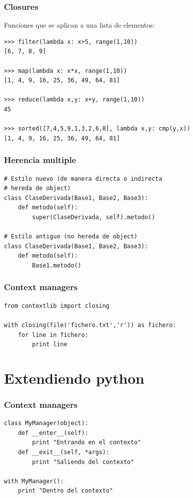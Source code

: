\documentclass[10pt]{beamer}
\begin{document}
  \begin{frame}[containsverbatim]
    \frametitle{Closures}
Funciones que se aplican a una lista de elementos:
    \begin{verbatim}
>>> filter(lambda x: x>5, range(1,10))
[6, 7, 8, 9]

>>> map(lambda x: x*x, range(1,10))
[1, 4, 9, 16, 25, 36, 49, 64, 81]

>>> reduce(lambda x,y: x+y, range(1,10))
45

>>> sorted([7,4,5,9,1,3,2,6,8], lambda x,y: cmp(y,x))
[1, 4, 9, 16, 25, 36, 49, 64, 81]
    \end{verbatim}
  \end{frame}

  \begin{frame}[containsverbatim]
    \frametitle{Herencia multiple}
    \begin{verbatim}
# Estilo nuevo (de manera directa o indirecta
# hereda de object)
class ClaseDerivada(Base1, Base2, Base3):
    def metodo(self):
        super(ClaseDerivada, self).metodo()

# Estilo antiguo (no hereda de object)
class ClaseDerivada(Base1, Base2, Base3):
    def metodo(self):
        Base1.metodo()
    \end{verbatim}
  \end{frame}

  \begin{frame}[containsverbatim]
    \frametitle{Context managers}
    \begin{verbatim}
from contextlib import closing

with closing(file('fichero.txt','r')) as fichero:
    for line in fichero:
        print line
    \end{verbatim}
  \end{frame}

  \section{Extendiendo python}

  \begin{frame}[containsverbatim]
    \frametitle{Context managers}
    \begin{verbatim}
class MyManager(object):
    def __enter__(self):
        print "Entrando en el contexto"
    def __exit__(self, *args):
        print "Saliendo del contexto"

with MyManager():
    print "Dentro del contexto"
    \end{verbatim}
  \end{frame}
\end{document}
